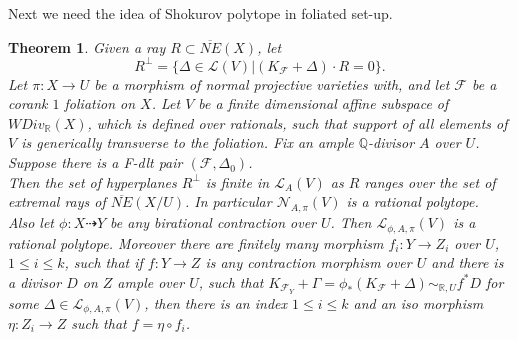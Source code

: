 \documentclass[12pt]{amsart}%
\theoremstyle{plain}
\newtheorem{theorem}{Theorem}[section]
\theoremstyle{remark}
\theoremstyle{definition}
\newcommand{\<}{\leq}
\newcommand{\mbQ}{\mathbb{Q}}
\newcommand{\mbR}{\mathbb{R}}
\theoremstyle{definition}
\theoremstyle{definition}
\numberwithin{equation}{section}
\theoremstyle{remark}
\begin{document}
Next we need the idea of Shokurov polytope in foliated set-up. 
\begin{theorem}\label{SPT}
    Given a ray $R\subset \overline{NE}(X)$, let \[
    R^{\bot}=\lbrace \Delta\in \mathcal{L}(V)| (K_{\mathcal{F}}+\Delta)\cdot R=0\rbrace.
    \]
    Let $\pi:X\rightarrow U$ be a morphism of normal projective varieties with, and let $\mathcal{F}$ be a corank $1$ foliation on $X$. Let $V$ be a finite dimensional affine subspace of $WDiv_{\mbR}(X)$, which is defined over rationals, such that support of all elements of $V$ is generically transverse to the foliation. Fix an ample $\mbQ$-divisor $A$ over $U$. Suppose there is a F-dlt pair $(\mathcal{F},\Delta_0)$.\\
    Then the set of hyperplanes $R^{\bot}$ is finite in $\mathcal{L}_A(V)$ as $R$ ranges over the set of extremal rays of $\overline{NE}(X/U)$. In particular $\mathcal{N}_{A,\pi}(V)$ is a rational polytope.\\
    Also let $\phi:X\dashrightarrow Y$ be any birational contraction over $U$. Then $\mathcal{L}_{\phi,A,\pi}(V)$ is a rational polytope. Moreover there are finitely many morphism $f_i:Y\rightarrow Z_i$ over $U$, $1\leqslant i\leqslant k$, such that if $f:Y\rightarrow Z$ is any contraction morphism over $U$ and there is a divisor $D$ on $Z$ ample over $U$, such that $K_{\mathcal{F}_Y}+\Gamma=\phi_*(K_{\mathcal{F}}+\Delta)\sim_{\mbR,U}f^*D$ for some $\Delta\in\mathcal{L}_{\phi,A,\pi}(V)$, then there is an index $1\leqslant i\leqslant k$ and an iso morphism $\eta: Z_i\rightarrow Z$ such that $f=\eta\circ f_i$.
\end{theorem}
\end{document}
